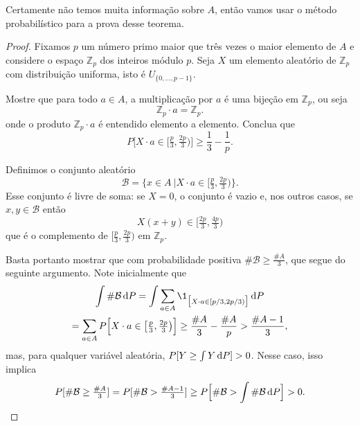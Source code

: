 \begin{topics}
Certamente não temos muita informação sobre $A$, então vamos usar o método probabilístico para a prova desse teorema.

\begin{proof}
  Fixamos $p$ um número primo maior que três vezes o maior elemento de $A$ e considere o espaço $\mathbb{Z}_p$ dos inteiros módulo $p$.
  Seja $X$ um elemento aleatório de $\mathbb{Z}_p$ com distribuição uniforma, isto é $U_{\{0, \dots, p-1\}}$.
  \begin{exercise}
    Mostre que para todo $a \in A$, a multiplicação por $a$ é uma bijeção em $\mathbb{Z}_p$, ou seja
    \begin{equation}
      \mathbb{Z}_p \cdot a = \mathbb{Z}_p.
    \end{equation}
    onde o produto $\mathbb{Z}_p \cdot a$ é entendido elemento a elemento.
    Conclua que
    \begin{equation}
      P \Big[ X \cdot a \in \big[ \tfrac{p}{3}, \tfrac {2p}{3} \big) \Big] \geq \frac{1}{3} -\frac{1}{p}.
    \end{equation}
  \end{exercise}
  Definimos o conjunto aleatório
  \begin{equation}
    \mathcal{B} = \{ x \in A \ | X \cdot a \in [\tfrac p3, \tfrac {2p}3) \}.
  \end{equation}
  Esse conjunto é livre de soma: se $X=0$, o conjunto é vazio e, nos outros casos, se $x, y \in \mathcal{B}$ então
  \begin{equation}
    X (x+y)\in [\tfrac {2p}3, \tfrac {4p} 3)
  \end{equation}
  que é o complemento de $[\tfrac{p}{3}, \tfrac{2p}{3} )$ em $\mathbb{Z}_p$.
  \medskip

  Basta portanto mostrar que com probabilidade positiva $\# \mathcal{B} \geq \tfrac{\#A}3$, que segue do seguinte argumento.
  Note inicialmente que
  \begin{multline*}
    \int \# \mathcal{B} \d P = \int \sum_{a \in A} \1_{\big[ X \cdot a \in [p/3, 2p/3) \big]} \d P \\
    =
    \sum_{a \in A} P \Big[ X \cdot a \in \big[ \tfrac{p}{3}, \tfrac {2p}{3} \big) \Big] \geq \frac{\# A}{3}- \frac{\# A}{p}> \frac{\# A-1 }{3},
  \end{multline*}
  mas, para qualquer variável aleatória,  $P[Y \geq \int Y \mathop{}\!\mathrm{d} P] > 0$.
  Nesse caso, isso implica
    \begin{equation}
      P[ \# \mathcal{B} \ge \tfrac{\# A}3 ] =  P[ \# \mathcal{B} > \tfrac{\# A-1 }3 ] \geq P \Big[ \# \mathcal{B} > \int \# \mathcal{B} \mathop{}\!\mathrm{d} P \Big] >0.
    \end{equation}
\end{proof}


\end{topics}

